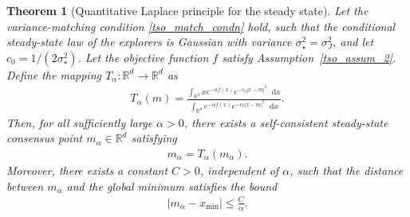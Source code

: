 \documentclass{article}
\def\R{\mathbb{R}}
\newcommand*\der{\mathop{}\!\mathrm{d}}
\newtheorem{theorem}{Theorem}[section]
\numberwithin{equation}{section}
\begin{document}
\begin{theorem}[Quantitative Laplace principle for the steady state]
\label{thm:steady_state_laplace}
Let the variance-matching condition \eqref{tso_match_condn} hold, such that the conditional steady-state law of the explorers is Gaussian with variance $\sigma_\star^2 = \sigma_J^2$, and let $c_0 = 1/(2\sigma_\star^2)$. Let the objective function $f$ satisfy Assumption~\ref{tso_assum_2}. Define the mapping $T_\alpha: \mathbb{R}^d \to \mathbb{R}^d$ as
\begin{align}
    T_\alpha(m) = \frac{\int_{\R^d} x e^{-\alpha f(x)} e^{-c_0 |x - m|^2} \der x}{\int_{\mathbb{R}^d} e^{-\alpha f(x)} e^{-c_0 |x - m|^2} \der x}.
\end{align}
Then, for all sufficiently large $\alpha > 0$, there exists a self-consistent steady-state consensus point $m_\alpha \in \mathbb{R}^d$ satisfying 
\begin{align}\label{tso_eqn_3.15}
    m_\alpha = T_\alpha(m_\alpha).
\end{align}
Moreover, there exists a constant $C > 0$, independent of $\alpha$, such that the distance between $m_\alpha$ and the global minimum satisfies the bound
\begin{align}
    |m_\alpha - x_{\min}| \le \frac{C}{\alpha}.
\end{align}
\end{theorem}
\end{document}
